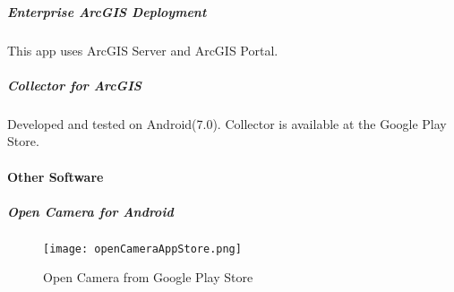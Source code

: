 \documentclass[class=book , crop=false, titlepage, twoside, multi={itemize, figure, verbatim}, float=false]{standalone}
\begin{document}
\subparagraph{Enterprise ArcGIS Deployment}This app uses ArcGIS Server and ArcGIS Portal.

\subparagraph{Collector for ArcGIS}Developed and tested on Android(7.0).  Collector is available at the Google Play Store.

\paragraph{Other Software}

\subparagraph{Open Camera for Android}
%
%
\begin{figure}[h!]
\centering
    \texttt{[image: openCameraAppStore.png]}
\caption{Open Camera from Google Play Store}
\end{figure}
\end{document}
